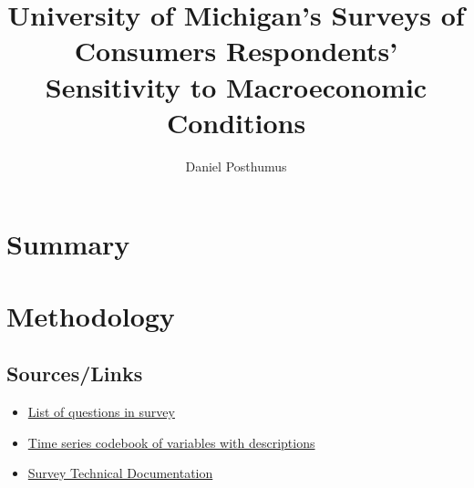 \documentclass{article}
\title{University of Michigan's Surveys of Consumers Respondents' Sensitivity to Macroeconomic Conditions}
\author{Daniel Posthumus}
\begin{document}
\maketitle

\section{Summary}
 

\section{Methodology}
\subsection{Sources/Links}
\begin{itemize} 
	\item \href{https://data.sca.isr.umich.edu/fetchdoc.php?docid=75440}{List of questions in survey}
	\item \href{https://data.sca.isr.umich.edu/fetchdoc.php?docid=75439}{Time series codebook of variables with descriptions}
	\item \href{https://data.sca.isr.umich.edu/technical-docs.php}{Survey Technical Documentation}
\end{itemize} 
\end{document}
